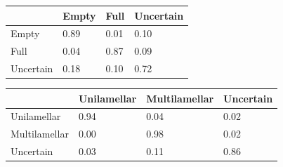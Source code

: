 \documentclass[a4paper, 11pt, table]{article}
\begin{document}
\begin{center}
\label{table:svm_cf_avg_encapsulation}
\begin{tabular}{|L{2.5cm} |C{2.5cm} |C{2.5cm} |C{2.5cm}|}
\toprule
 & Empty & Full & Uncertain \\
\midrule
Empty & 0.89 & 0.01 & 0.10 \\
Full & 0.04 & 0.87 & 0.09 \\
Uncertain & 0.18 & 0.10 & 0.72 \\
\bottomrule
\end{tabular}
\end{center}

\begin{center}
\label{table:svm_cf_avg_lamellarity}
\begin{tabular}{|L{2.5cm} |C{2.5cm} |C{2.5cm} |C{2.5cm}|}
\toprule
 & Unilamellar & Multilamellar & Uncertain \\
\midrule
Unilamellar & 0.94 & 0.04 & 0.02 \\
Multilamellar & 0.00 & 0.98 & 0.02 \\
Uncertain & 0.03 & 0.11 & 0.86 \\
\bottomrule
\end{tabular}
\end{center}
\end{document}
